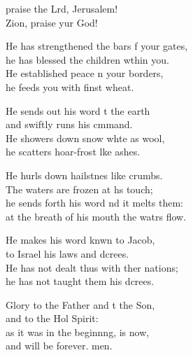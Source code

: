 \settowidth{\versewidth}{He has strengthened the bars of your gates, *}
\begin{psalmverse}%
  \begin{patverse}
     praise the Lrd, Jerusalem!\Med\\
    Zion, praise yur God!
    
    He has strengthened the bars f your gates,\Med\\
    he has blessed the children w\pointup{\i}thin you.\\
    He established peace n your borders,\Med\\
    he feeds you with finst wheat.
    
    He sends out his word t the earth\Med\\
    and swiftly runs his cmmand.\\
    He showers down snow wh\pointup{\i}te as wool,\Med\\
    he scatters hoar-frost l\pointup{\i}ke ashes.
    
    He hurls down hailstnes like crumbs.\Med\\
    The waters are frozen at h\pointup{\i}s touch;\\
    he sends forth his word nd it melts them:\Med\\
    at the breath of his mouth the watrs flow.
    
    He makes his word knwn to Jacob,\Med\\
    to Israel his laws and dcrees.\\
    He has not dealt thus with ther nations;\Med\\
    he has not taught them his dcrees.
    
    Glory to the Father and t the Son,\Med\\
    and to the Hol Spirit:\\
    as it was in the beginn\pointup{\i}ng, is now,\Med\\
    and will be forever. men.
  \end{patverse}
\end{psalmverse}
